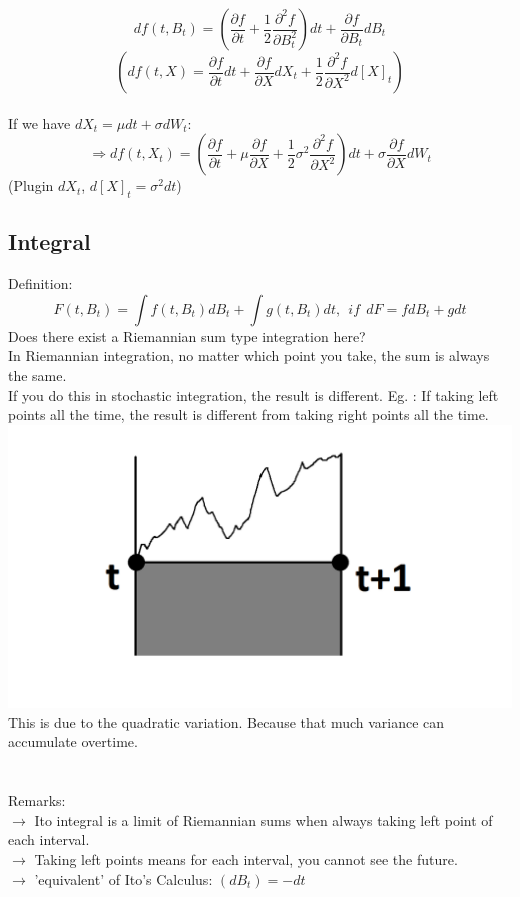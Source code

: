 \documentclass[12pt]{article}
\begin{document}
$$df(t,B_t)=(\frac{\partial f}{\partial t}+\frac{1}{2}\frac{\partial^2 f}{\partial B_t^2})dt + {\frac{\partial f}{\partial B_t}}dB_t$$
$$(df(t,X)=\frac{\partial f}{\partial t}dt + \frac{\partial f}{\partial X}dX_t + \frac{1}{2}\frac{\partial^2 f}{\partial X^2}d[X]_t)$$
\\
If we have $dX_t=\mu dt + \sigma dW_t$:
$$\Rightarrow df(t,X_t)=(\frac{\partial f}{\partial t}+\mu\frac{\partial f}{\partial X} + \frac{1}{2}\sigma^2\frac{\partial^2 f}{\partial X^2})dt + \sigma\frac{\partial f}{\partial X}dW_t$$
(Plugin $dX_t$, $d[X]_t=\sigma^2 dt$)

\subsection{Integral}
Definition:
$$F(t,B_t)=\int f(t,B_t)dB_t + \int g(t,B_t)dt, \ \ if \ \ dF=fdB_t + gdt$$
Does there exist a Riemannian sum type integration here?\\
In Riemannian integration, no matter which point you take, the sum is always the same.\\
If you do this in stochastic integration, the result is different. Eg. : If taking left points all the time, the result is different from taking right points all the time.\\
\includegraphics[scale=0.5]{Figure_1_ItoIntegral.png}\\
This is due to the quadratic variation. Because that much variance can accumulate overtime.\\
\\
\\
Remarks:\\
$\rightarrow$ Ito integral is a limit of Riemannian sums when always taking left point of each interval.\\
$\rightarrow$ Taking left points means for each interval, you cannot see the future.\\
$\rightarrow$ 'equivalent' of Ito's Calculus: $(dB_t)=-dt$
\end{document}
